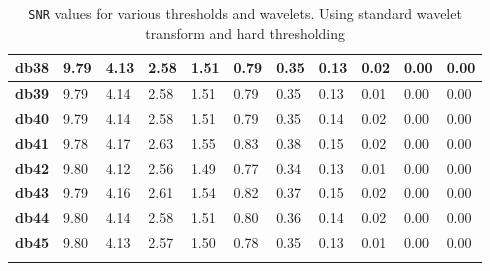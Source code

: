 \begin{tiny}
\begin{longtable}{|l|l|l|l|l|l|l|l|l|l|l|}
\textbf{db38}&9.79&4.13&2.58&1.51&0.79&0.35&0.13&0.02&0.00&0.00\\\hline
\textbf{db39}&9.79&4.14&2.58&1.51&0.79&0.35&0.13&0.01&0.00&0.00\\\hline
\textbf{db40}&9.79&4.14&2.58&1.51&0.79&0.35&0.14&0.02&0.00&0.00\\\hline
\textbf{db41}&9.78&4.17&2.63&1.55&0.83&0.38&0.15&0.02&0.00&0.00\\\hline
\textbf{db42}&9.80&4.12&2.56&1.49&0.77&0.34&0.13&0.01&0.00&0.00\\\hline
\textbf{db43}&9.79&4.16&2.61&1.54&0.82&0.37&0.15&0.02&0.00&0.00\\\hline
\textbf{db44}&9.80&4.14&2.58&1.51&0.80&0.36&0.14&0.02&0.00&0.00\\\hline
\textbf{db45}&9.80&4.13&2.57&1.50&0.78&0.35&0.13&0.01&0.00&0.00\\\hline
\caption{\texttt{SNR} values for various thresholds and wavelets. Using standard wavelet transform and hard thresholding}
\label{tab:SNRStdHard}
\end{longtable}
\end{tiny}